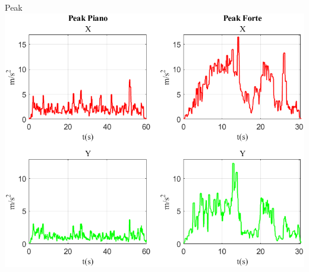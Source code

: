 \documentclass[beamer]{standalone}
\begin{document}
	\begin{frame}{{Peak}}
		\centering\includegraphics[height=.8\textheight]{figure/Acc/Peak}
	\end{frame}
	
	
	
	
	
	
	
\end{document}
